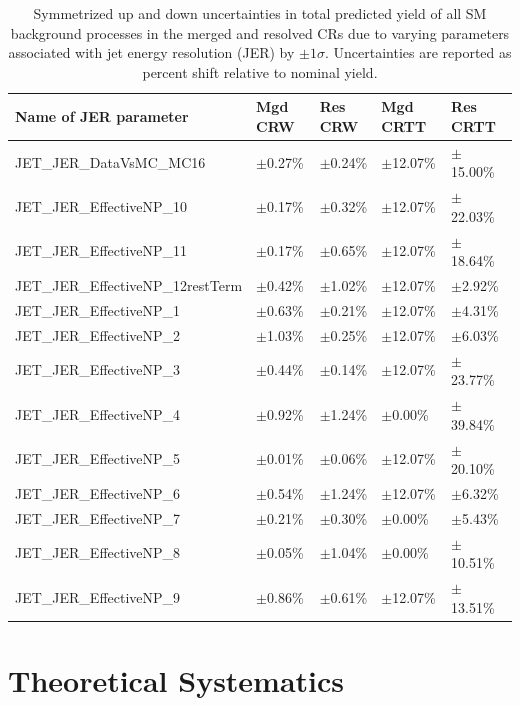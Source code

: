 \begin{table}[ht]
\caption[Symmetrized uncertainties in the total predicted yields of all SM background processes in the control regions associated with jet energy resolution.]{\label{tab:systs_total_bkg_JET_JER_CR} Symmetrized up and down uncertainties in total predicted yield of all SM background processes in the merged and resolved CRs due to varying parameters associated with jet energy resolution (JER) by \(\pm1\sigma\). Uncertainties are reported as percent shift relative to nominal yield.}
\footnotesize{
\begin{tabular}{l l l l l }
\toprule
\textbf{Name of JER parameter} & \textbf{Mgd CRW} & \textbf{Res CRW} & \textbf{Mgd CRTT} & \textbf{Res CRTT}\tabularnewline
\midrule
\midrule
JET\_JER\_DataVsMC\_MC16 & \(\pm\)0.27\% &\(\pm\)0.24\% &\(\pm\)12.07\% &\(\pm\)15.00\% \tabularnewline
\midrule
JET\_JER\_EffectiveNP\_10 & \(\pm\)0.17\% &\(\pm\)0.32\% &\(\pm\)12.07\% &\(\pm\)22.03\% \tabularnewline
\midrule
JET\_JER\_EffectiveNP\_11 & \(\pm\)0.17\% &\(\pm\)0.65\% &\(\pm\)12.07\% &\(\pm\)18.64\% \tabularnewline
\midrule
JET\_JER\_EffectiveNP\_12restTerm & \(\pm\)0.42\% &\(\pm\)1.02\% &\(\pm\)12.07\% &\(\pm\)2.92\% \tabularnewline
\midrule
JET\_JER\_EffectiveNP\_1 & \(\pm\)0.63\% &\(\pm\)0.21\% &\(\pm\)12.07\% &\(\pm\)4.31\% \tabularnewline
\midrule
JET\_JER\_EffectiveNP\_2 & \(\pm\)1.03\% &\(\pm\)0.25\% &\(\pm\)12.07\% &\(\pm\)6.03\% \tabularnewline
\midrule
JET\_JER\_EffectiveNP\_3 & \(\pm\)0.44\% &\(\pm\)0.14\% &\(\pm\)12.07\% &\(\pm\)23.77\% \tabularnewline
\midrule
JET\_JER\_EffectiveNP\_4 & \(\pm\)0.92\% &\(\pm\)1.24\% &\(\pm\)0.00\% &\(\pm\)39.84\% \tabularnewline
\midrule
JET\_JER\_EffectiveNP\_5 & \(\pm\)0.01\% &\(\pm\)0.06\% &\(\pm\)12.07\% &\(\pm\)20.10\% \tabularnewline
\midrule
JET\_JER\_EffectiveNP\_6 & \(\pm\)0.54\% &\(\pm\)1.24\% &\(\pm\)12.07\% &\(\pm\)6.32\% \tabularnewline
\midrule
JET\_JER\_EffectiveNP\_7 & \(\pm\)0.21\% &\(\pm\)0.30\% &\(\pm\)0.00\% &\(\pm\)5.43\% \tabularnewline
\midrule
JET\_JER\_EffectiveNP\_8 & \(\pm\)0.05\% &\(\pm\)1.04\% &\(\pm\)0.00\% &\(\pm\)10.51\% \tabularnewline
\midrule
JET\_JER\_EffectiveNP\_9 & \(\pm\)0.86\% &\(\pm\)0.61\% &\(\pm\)12.07\% &\(\pm\)13.51\% \tabularnewline
\bottomrule
\end{tabular}}
\end{table}

\section{Theoretical Systematics}

